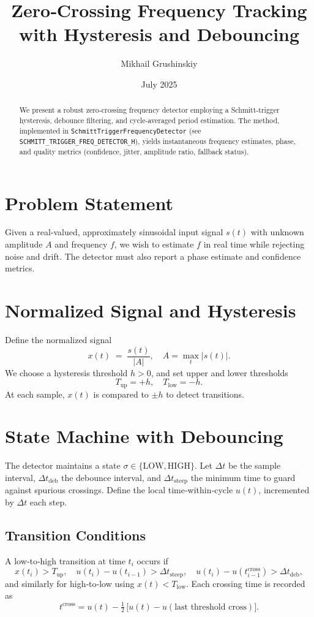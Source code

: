 \documentclass[11pt,letterpaper]{article}
\begin{document}
\title{Zero‐Crossing Frequency Tracking with Hysteresis and Debouncing}
\author{Mikhail Grushinskiy}
\date{July 2025}
\maketitle

\begin{abstract}
We present a robust zero‐crossing frequency detector employing a Schmitt‐trigger hysteresis, debounce filtering, and cycle‐averaged period estimation.  The method, implemented in \texttt{SchmittTriggerFrequencyDetector} (see \texttt{SCHMITT\_TRIGGER\_FREQ\_DETECTOR\_H}), yields instantaneous frequency estimates, phase, and quality metrics (confidence, jitter, amplitude ratio, fallback status).
\end{abstract}

\section{Problem Statement}
Given a real‐valued, approximately sinusoidal input signal \(s(t)\) with unknown amplitude \(A\) and frequency \(f\), we wish to estimate \(f\) in real time while rejecting noise and drift.  The detector must also report a phase estimate and confidence metrics.

\section{Normalized Signal and Hysteresis}
Define the normalized signal
\[
x(t) \;=\; \frac{s(t)}{\lvert A\rvert}, 
\quad A = \max_t |s(t)|.
\]
We choose a hysteresis threshold \(h>0\), and set upper and lower thresholds
\[
T_{\mathrm{up}} = +h,\quad T_{\mathrm{low}} = -h.
\]
At each sample, \(x(t)\) is compared to \(\pm h\) to detect transitions.

\section{State Machine with Debouncing}
The detector maintains a state \(\sigma \in \{\mathrm{LOW}, \mathrm{HIGH}\}\).  Let \(\Delta t\) be the sample interval, \(\Delta t_{\mathrm{deb}}\) the debounce interval, and \(\Delta t_{\mathrm{steep}}\) the minimum time to guard against spurious crossings.  Define the local time‐within‐cycle \(u(t)\), incremented by \(\Delta t\) each step.

\subsection{Transition Conditions}
A low‐to‐high transition at time \(t_i\) occurs if
\[
x(t_i) > T_{\mathrm{up}}, 
\quad u(t_i) - u(t_{i-1}) > \Delta t_{\mathrm{steep}}, 
\quad u(t_i) - u(t_{i-1}^{\mathrm{cross}}) > \Delta t_{\mathrm{deb}},
\]
and similarly for high‐to‐low using \(x(t) < T_{\mathrm{low}}\).  Each crossing time is recorded as
\[
t^{\mathrm{cross}} = u(t) - \tfrac12\,\bigl[u(t)-u(\text{last threshold cross})\bigr].
\]
\end{document}

